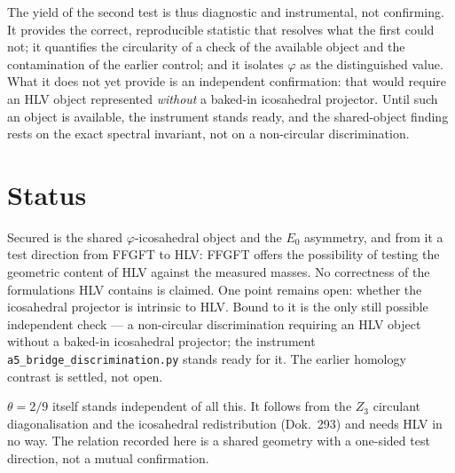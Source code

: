The yield of the second test is thus diagnostic and instrumental, not confirming. It provides the
correct, reproducible statistic that resolves what the first could not; it quantifies the
circularity of a check of the available object and the contamination of the earlier control; and
it isolates $\varphi$ as the distinguished value. What it does not yet provide is an independent
confirmation: that would require an HLV object represented \emph{without} a baked-in icosahedral
projector. Until such an object is available, the instrument stands ready, and the shared-object
finding rests on the exact spectral invariant, not on a non-circular discrimination.

\section{Status}
Secured is the shared $\varphi$-icosahedral object and the $E_0$ asymmetry, and from it a test
direction from FFGFT to HLV: FFGFT offers the possibility of testing the geometric content of HLV
against the measured masses. No correctness of the formulations HLV contains is claimed. One point
remains open: whether the icosahedral projector is intrinsic to HLV. Bound to it is the only still
possible independent check --- a non-circular discrimination requiring an HLV object without a
baked-in icosahedral projector; the instrument \texttt{a5\_bridge\_discrimination.py} stands ready
for it. The earlier homology contrast is settled, not open.

$\theta=2/9$ itself stands independent of all this. It follows from the $Z_3$ circulant
diagonalisation and the icosahedral redistribution (Dok.~293) and needs HLV in no way. The
relation recorded here is a shared geometry with a one-sided test direction, not a mutual
confirmation.
